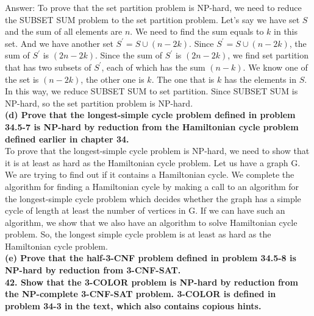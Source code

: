\documentclass{article}
\begin{document}
Answer: To prove that the set partition problem is NP-hard, we need to reduce the SUBSET SUM problem to the set partition problem. Let's say we have set $S$ and the sum of all elements are $n$. We need to find the sum equals to $k$ in this set. And we have another set $S^{'} = S\cup (n-2k)$. Since $S^{'} = S\cup (n-2k)$, the sum of $S^{'}$ is $(2n-2k)$.  Since the sum of $S^{'}$ is $(2n-2k)$, we find set partition that has two subsets of $S^{'}$, each of which has the sum $(n-k)$. We know one of the set is $(n-2k)$, the other one is $k$. The one that is $k$ has the elements in $S$. In this way, we reduce SUBSET SUM to set partition. Since SUBSET SUM is NP-hard, so the set partition problem is NP-hard. \\ \newline
\textbf{(d) Prove that the longest-simple cycle problem defined in problem 34.5-7 is NP-hard by reduction from the Hamiltonian cycle problem defined earlier in chapter 34.} \\ \newline
To prove that the longest-simple cycle problem is NP-hard, we need to show that it is at least as hard as the Hamiltonian cycle problem. Let us have a graph G. We are trying to find out if it contains a Hamiltonian cycle. We complete the algorithm for finding a Hamiltonian cycle by making a call to an algorithm for the longest-simple cycle problem which decides whether the graph has a simple cycle of length at least the number of vertices in G. If we can have such an algorithm, we show that we also have an algorithm to solve Hamiltonian cycle problem. So, the longest simple cycle problem is at least as hard as the Hamiltonian cycle problem. \\ \newline 
\textbf{(e) Prove that the half-3-CNF problem defined in problem 34.5-8 is NP-hard by reduction from 3-CNF-SAT.} \\ \newline
\textbf{42. Show that the 3-COLOR problem is NP-hard by reduction from the NP-complete 3-CNF-SAT problem. 3-COLOR is defined in problem 34-3 in the text, which also contains copious hints.}
\end{document}
